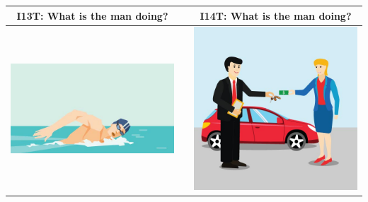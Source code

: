 \documentclass[12pt,notitlepage]{article}
\begin{document}
\begin{center}
\begin{tabular}{|c|c|c|}
\hline
I13T: What is the man doing? && I14T: What is the man doing? \\
\hline
\includegraphics[width=20em,trim=0 0 0 -3]{figures/I13.jpg} & & \includegraphics[width=20em,trim=0 0 0 -3]{figures/I14.jpg} \\
\hline
\end{tabular}
\vspace{1em} \\



\end{center}
\end{document}
